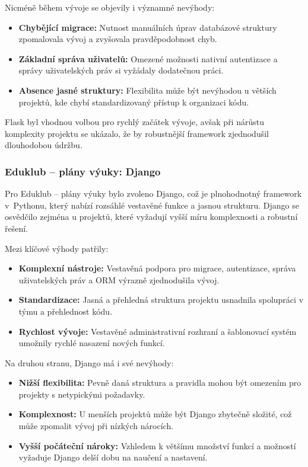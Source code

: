\documentclass[male,czech,api_bc]{kitheses}
\begin{document}
Nicméně během vývoje se objevily i významné nevýhody:
\begin{itemize}
	\item \textbf{Chybějící migrace:} Nutnost manuálních úprav databázové struktury zpomalovala vývoj a zvyšovala pravděpodobnost chyb.
	\item \textbf{Základní správa uživatelů:} Omezené možnosti nativní autentizace a správy uživatelských práv si vyžádaly dodatečnou práci.
	\item \textbf{Absence jasné struktury:} Flexibilita může být nevýhodou u větších projektů, kde chybí standardizovaný přístup k organizaci kódu.
\end{itemize}

Flask byl vhodnou volbou pro rychlý začátek vývoje, avšak při nárůstu komplexity projektu se ukázalo, že by robustnější framework zjednodušil dlouhodobou údržbu.

\subsubsection{Eduklub – plány výuky: Django}

Pro Eduklub – plány výuky bylo zvoleno Django, což je plnohodnotný framework v~Pythonu, který nabízí rozsáhlé vestavěné funkce a jasnou strukturu. Django se osvědčilo zejména u projektů, které vyžadují vyšší míru komplexnosti a robustní řešení.

Mezi klíčové výhody patřily:
\begin{itemize}
	\item \textbf{Komplexní nástroje:} Vestavěná podpora pro migrace, autentizace, správa uživatelských práv a ORM výrazně zjednodušila vývoj.
	\item \textbf{Standardizace:} Jasná a přehledná struktura projektu usnadnila spolupráci v týmu a přehlednost kódu.
	\item \textbf{Rychlost vývoje:} Vestavěné administrativní rozhraní a šablonovací systém umožnily rychlé nasazení nových funkcí.
\end{itemize}

Na druhou stranu, Django má i své nevýhody:
\begin{itemize}
	\item \textbf{Nižší flexibilita:} Pevně daná struktura a pravidla mohou být omezením pro projekty s netypickými požadavky.
	\item \textbf{Komplexnost:} U menších projektů může být Django zbytečně složité, což může zpomalit vývoj při nízkých nárocích.
	\item \textbf{Vyšší počáteční nároky:} Vzhledem k většímu množství funkcí a možností vyžaduje Django delší dobu na naučení a nastavení.
\end{itemize}
\end{document}
